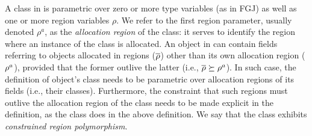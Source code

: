 A class in \FB is parametric over zero or more type variables (as
in FGJ) as well as one or more region variables $\rho$.
We refer to the first region parameter, usually denoted $\rho^a$, as
the \emph{allocation region} of the class: it serves to identify the
region where an instance of the class is allocated.
%
An object in \FB can contain fields referring to objects allocated in regions ($\overline{\rho}$) other than its
own allocation region ($\rho^a$), provided that the former outlive
the latter (i.e., $\overline{\rho} \succeq \rho^a$). In such case, the
definition of object's class needs to be parametric over allocation
regions of its fields (i.e., their classes). Furthermore, the
constraint that such regions must outlive the allocation region of the
class needs to be made explicit in the definition, as the 
class does in the above definition. We say that the  class
exhibits \emph{constrained region polymorphism}.
%

